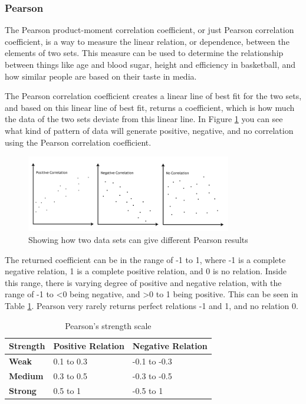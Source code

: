 \subsubsection{Pearson}

The Pearson product-moment correlation coefficient, or just Pearson correlation coefficient, is a way to measure the linear relation, or dependence, between the elements of two sets. This measure can be used to determine the relationship between things like age and blood sugar, height and efficiency in basketball, and how similar people are based on their taste in media. \cite{Pearson2}

The Pearson correlation coefficient creates a linear line of best fit for the two sets, and based on this linear line of best fit, returns a coefficient, which is how much the data of the two sets deviate from this linear line. In Figure \ref{Pearson2} you can see what kind of pattern of data will generate positive, negative, and no correlation using the Pearson correlation coefficient. \cite{Pearson2}

\begin{figure}[H]
\centering
\includegraphics[width=0.8\textwidth]{Images/pearson2.png}
\caption{Showing how two data sets can give different Pearson results \cite{Pearson2}}
\label{Pearson2}
\end{figure}

The returned coefficient can be in the range of -1 to 1, where -1 is a complete negative relation, 1 is a complete positive relation, and 0 is no relation. Inside this range, there is varying degree of positive and negative relation, with the range of -1 to <0 being negative, and >0 to 1 being positive. This can be seen in Table \ref{PearsonStr}. Pearson very rarely returns perfect relations -1 and 1, and no relation 0. \cite{Pearson2}

\begin{table}[htb]
\centering
\begin{tabular}{|l|l|l|} \hline
	\textbf{Strength} & \textbf{Positive Relation} & \textbf{Negative Relation} \\ \hline
	\textbf{Weak} & 0.1 to 0.3 & -0.1 to -0.3 \\ \hline
	\textbf{Medium} & 0.3 to 0.5 & -0.3 to -0.5 \\ \hline
	\textbf{Strong} & 0.5 to 1 & -0.5 to 1 \\ \hline
\end{tabular}
\caption{Pearson's strength scale \cite{Pearson2}}
\label{PearsonStr}
\end{table}

